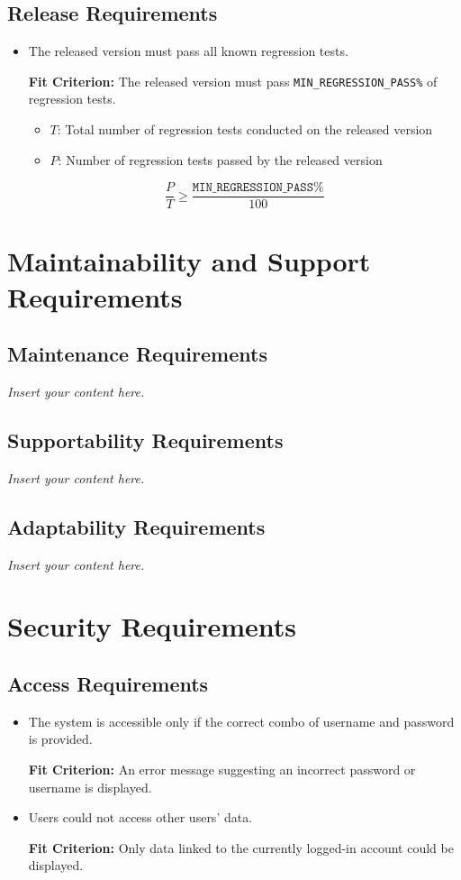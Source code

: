 \documentclass[12pt]{article}
\newcommand{\lips}{\textit{Insert your content here.}}
\newcounter{nfrnum} %
\newcommand{\rthenfrnum}{NFR\refstepcounter{nfrnum}\thenfrnum:}
\begin{document}
\subsection{Release Requirements}
\begin{itemize}
\item[\rthenfrnum]
The released version must pass all known regression tests.

\textbf{Fit Criterion:} The released version must pass \texttt{MIN\_REGRESSION\_PASS\%} of regression tests. 
\begin{itemize}
    \item \( T \): Total number of regression tests conducted on the released version
    \item \( P \): Number of regression tests passed by the released version
\end{itemize}
\[
    \frac{P}{T} \geq \frac{\texttt{MIN\_REGRESSION\_PASS\%}}{100}
\]
\end{itemize}
\section{Maintainability and Support Requirements}
\subsection{Maintenance Requirements}
\lips
\subsection{Supportability Requirements}
\lips
\subsection{Adaptability Requirements}
\lips

\section{Security Requirements}
\subsection{Access Requirements}
\begin{itemize}
\item[\rthenfrnum]
The system is accessible only if the correct combo of username and password is provided.

\textbf{Fit Criterion:} An error message suggesting an incorrect password or username is displayed.
\item[\rthenfrnum]
Users could not access other users' data.

\textbf{Fit Criterion:} Only data linked to the currently logged-in account could be displayed.
\end{itemize}
\end{document}
